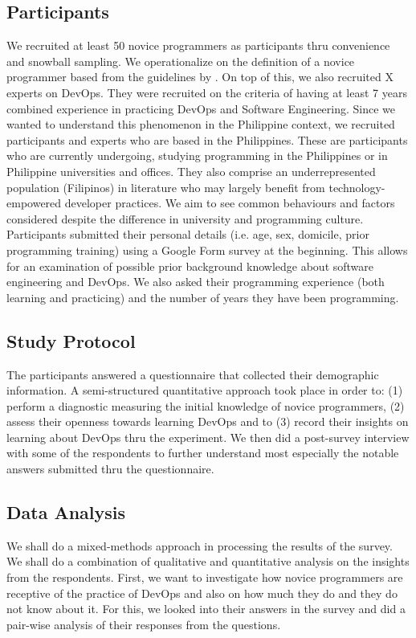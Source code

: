 \documentclass{sigchi}
\begin{document}
\subsection{Participants}
We recruited at least 50 novice programmers as participants thru convenience and snowball sampling. We operationalize on the definition of a novice programmer based from the guidelines by \cite{teague2014longitudinal}. On top of this, we also recruited X experts on DevOps. They were recruited on the criteria of having at least 7 years combined experience in practicing DevOps and Software Engineering. Since we wanted to understand this phenomenon in the Philippine context, we recruited participants and experts who are based in the Philippines. These are participants who are currently undergoing, studying programming in the Philippines or in Philippine universities and offices. They also comprise an underrepresented population (Filipinos) in literature who may largely benefit from technology-empowered developer practices. We aim to see common behaviours and factors considered despite the difference in university and programming culture. Participants submitted their personal details (i.e. age, sex, domicile, prior programming training) using a Google Form survey at the beginning. This allows for an examination of possible prior background knowledge about software engineering and DevOps. We also asked their programming experience (both learning and practicing) and the number of years they have been programming. 

\subsection{Study Protocol}
The participants answered a questionnaire that collected their demographic information. A semi-structured quantitative approach took place in order to: (1) perform a diagnostic measuring the initial knowledge of novice programmers, (2) assess their openness towards learning DevOps and to (3) record their insights on learning about DevOps thru the experiment. We then did a post-survey interview with some of the respondents to further understand most especially the notable answers submitted thru the questionnaire. 

\subsection{Data Analysis}
We shall do a mixed-methods approach in processing the results of the survey. We shall do a combination of qualitative and quantitative analysis on the insights from the respondents. First, we want to investigate how novice programmers are receptive of the practice of DevOps and also on how much they do and they do not know about it. For this, we looked into their answers in the survey and did a pair-wise analysis of their responses from the questions. 
\end{document}
